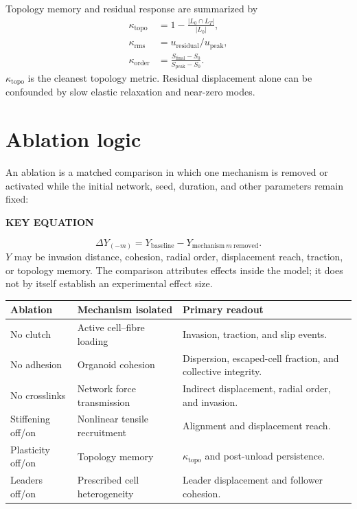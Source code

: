 \documentclass[10.5pt]{article}
\newcommand{\keylabel}{\par\smallskip\noindent\textcolor{g5}{\textbf{KEY EQUATION}}\par\vspace{-5pt}}
\begin{document}
Topology memory and residual response are summarized by
\begin{align}
 \kappa_{\mathrm{topo}}&=1-
 \frac{|L_0\cap L_T|}{|L_0|},\\
 \kappa_{\mathrm{rms}}&=u_{\mathrm{residual}}/u_{\mathrm{peak}},\\
 \kappa_{\mathrm{order}}&=
 \frac{S_{\mathrm{final}}-S_0}{S_{\mathrm{peak}}-S_0}.
 \label{eq:memory}
\end{align}
$\kappa_{\mathrm{topo}}$ is the cleanest topology metric. Residual displacement alone can be
confounded by slow elastic relaxation and near-zero modes.

\section{Ablation logic}

An ablation is a matched comparison in which one mechanism is removed or activated while the
initial network, seed, duration, and other parameters remain fixed:
\keylabel
\begin{equation}
 \Delta Y_{(-m)}=Y_{\mathrm{baseline}}-Y_{\mathrm{mechanism}\ m\ \mathrm{removed}}.
 \label{eq:ablation}
\end{equation}
$Y$ may be invasion distance, cohesion, radial order, displacement reach, traction, or topology
memory. The comparison attributes effects inside the model; it does not by itself establish an
experimental effect size.

\begin{longtable}{>{\raggedright\arraybackslash}p{}p{}p{}}
\toprule
Ablation & Mechanism isolated & Primary readout \\
\midrule
No clutch & Active cell--fibre loading & Invasion, traction, and slip events. \\
No adhesion & Organoid cohesion & Dispersion, escaped-cell fraction, and collective integrity. \\
No crosslinks & Network force transmission & Indirect displacement, radial order, and invasion. \\
Stiffening off/on & Nonlinear tensile recruitment & Alignment and displacement reach. \\
Plasticity off/on & Topology memory & $\kappa_{\mathrm{topo}}$ and post-unload persistence. \\
Leaders off/on & Prescribed cell heterogeneity & Leader displacement and follower cohesion. \\
\bottomrule
\end{longtable}
\end{document}
